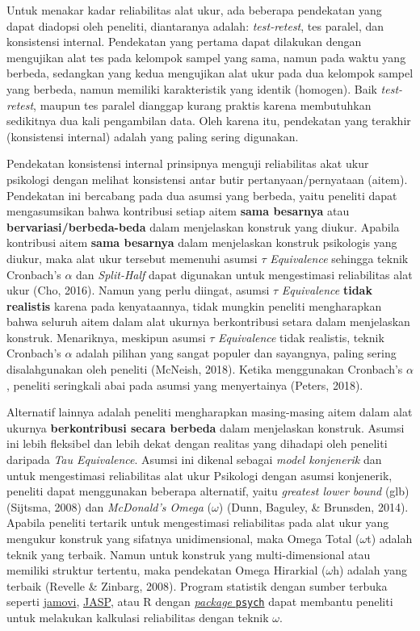 \documentclass[
  english,
  man]{apa6}
\begin{document}
Untuk menakar kadar reliabilitas alat ukur, ada beberapa pendekatan yang dapat diadopsi oleh peneliti, diantaranya adalah: \emph{test-retest}, tes paralel, dan konsistensi internal. Pendekatan yang pertama dapat dilakukan dengan mengujikan alat tes pada kelompok sampel yang sama, namun pada waktu yang berbeda, sedangkan yang kedua mengujikan alat ukur pada dua kelompok sampel yang berbeda, namun memiliki karakteristik yang identik (homogen). Baik \emph{test-retest}, maupun tes paralel dianggap kurang praktis karena membutuhkan sedikitnya dua kali pengambilan data. Oleh karena itu, pendekatan yang terakhir (konsistensi internal) adalah yang paling sering digunakan.

Pendekatan konsistensi internal prinsipnya menguji reliabilitas akat ukur psikologi dengan melihat konsistensi antar butir pertanyaan/pernyataan (aitem). Pendekatan ini bercabang pada dua asumsi yang berbeda, yaitu peneliti dapat mengasumsikan bahwa kontribusi setiap aitem \textbf{sama besarnya} atau \textbf{bervariasi/berbeda-beda } dalam menjelaskan konstruk yang diukur. Apabila kontribusi aitem \textbf{sama besarnya} dalam menjelaskan konstruk psikologis yang diukur, maka alat ukur tersebut memenuhi asumsi \({\tau}\) \emph{Equivalence} sehingga teknik Cronbach's \({\alpha}\) dan \emph{Split-Half} dapat digunakan untuk mengestimasi reliabilitas alat ukur (Cho, 2016). Namun yang perlu diingat, asumsi \({\tau}\) \emph{Equivalence} \textbf{tidak realistis} karena pada kenyataannya, tidak mungkin peneliti mengharapkan bahwa seluruh aitem dalam alat ukurnya berkontribusi setara dalam menjelaskan konstruk. Menariknya, meskipun asumsi \({\tau}\) \emph{Equivalence} tidak realistis, teknik Cronbach's \({\alpha}\) adalah pilihan yang sangat populer dan sayangnya, paling sering disalahgunakan oleh peneliti (McNeish, 2018). Ketika menggunakan Cronbach's \({\alpha}\), peneliti seringkali abai pada asumsi yang menyertainya (Peters, 2018).

Alternatif lainnya adalah peneliti mengharapkan masing-masing aitem dalam alat ukurnya \textbf{berkontribusi secara berbeda} dalam menjelaskan konstruk. Asumsi ini lebih fleksibel dan lebih dekat dengan realitas yang dihadapi oleh peneliti daripada \emph{Tau Equivalence}. Asumsi ini dikenal sebagai \emph{model konjenerik} dan untuk mengestimasi reliabilitas alat ukur Psikologi dengan asumsi konjenerik, peneliti dapat menggunakan beberapa alternatif, yaitu \emph{greatest lower bound} (glb) (Sijtsma, 2008) dan \emph{McDonald's Omega} (\({\omega}\)) (Dunn, Baguley, \& Brunsden, 2014). Apabila peneliti tertarik untuk mengestimasi reliabilitas pada alat ukur yang mengukur konstruk yang sifatnya unidimensional, maka Omega Total (\({\omega}\)t) adalah teknik yang terbaik. Namun untuk konstruk yang multi-dimensional atau memiliki struktur tertentu, maka pendekatan Omega Hirarkial (\({\omega}\)h) adalah yang terbaik (Revelle \& Zinbarg, 2008). Program statistik dengan sumber terbuka seperti \href{https://www.jamovi.org/}{jamovi}, \href{http://jasp-stats.org/}{JASP}, atau R dengan \href{https://cran.r-project.org/web/packages/psych/index.html}{\emph{package} \texttt{psych}} dapat membantu peneliti untuk melakukan kalkulasi reliabilitas dengan teknik \({\omega}\).
\end{document}
